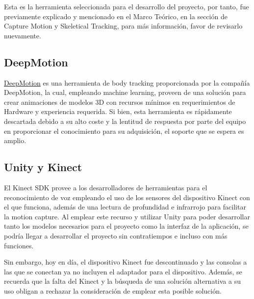 Esta es la herramienta seleccionada para el desarrollo del proyecto, por tanto, fue previamente explicado y mencionado en el Marco Teórico, en la sección de Capture Motion y Skeletical Tracking, para más información, favor de revisarlo nuevamente.



\subsection{DeepMotion}
\href{https://deepmotion.com/3d-body-tracking}{DeepMotion} es una herramienta de body tracking proporcionada por la compañía DeepMotion, la cual, empleando machine learning, proveen de una solución para crear animaciones de modelos 3D con recursos mínimos en requerimientos de Hardware y experiencia requerida. Si bien, esta herramienta es rápidamente descartada debido a su alto coste y la lentitud de respuesta por parte del equipo en proporcionar el conocimiento para su adquisición, el soporte que se espera es amplio.

\subsection{Unity y Kinect}

El Kinect SDK provee a los desarrolladores de herramientas para el reconocimiento de voz empleando el uso de los sensores del dispositivo Kinect con el que funciona, además de una lectura de profundidad e infrarrojo para facilitar la motion capture. Al emplear este recurso y utilizar Unity para poder desarrollar tanto los modelos necesarios para el proyecto como la interfaz de la aplicación, se podría llegar a desarrollar el proyecto sin contratiempos e incluso con más funciones.

Sin embargo, hoy en día, el dispositivo Kinect fue descontinuado y las consolas a las que se conectan ya no incluyen el adaptador para el dispositivo. Además, se recuerda que la falta del Kinect y la búsqueda de una solución alternativa a su uso obligan a rechazar la consideración de emplear esta posible solución.










